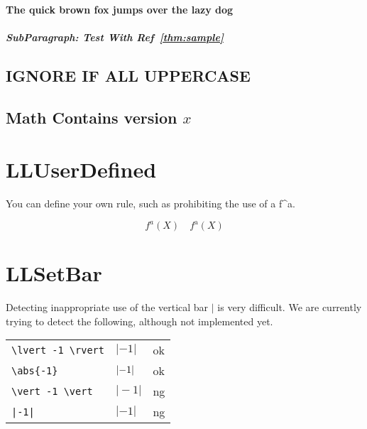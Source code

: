 \documentclass[a4paper]{article}
\newcommand{\tA}[1]{\textcolor{cA}{#1}}
\newcommand{\tD}[1]{\textcolor{cD}{#1}}
\begin{document}
\paragraph{The quick brown fox jumps over the lazy dog}

\subparagraph{SubParagraph: Test With Ref~\ref{thm:sample}}

\subsection{IGNORE IF ALL UPPERCASE}

\subsection{Math Contains version $x$}

\section{LLUserDefined}

You can define your own rule, such as prohibiting the use of a f\^{}a.

\begin{equation*}
	f^a(X) \quad f^{\mathrm{a}}(X)
\end{equation*}

\newpage
\appendix

\renewcommand\thesection{Appendix \Alph{section}}

\section{LLSetBar}

Detecting inappropriate use of the vertical bar $|$ is very difficult.
We are currently trying to detect the following, although not implemented yet.

\begin{table}[H]
	\centering
	\begin{tabular}{lll}
		\verb#\lvert -1 \rvert# & $\lvert -1 \rvert$ & \tA{ok} \\
		\verb#\abs{-1}#         & $\abs{-1}$         & \tA{ok} \\
		\verb#\vert -1 \vert#   & $\vert -1 \vert$   & \tD{ng} \\
		\verb#|-1|#             & $|-1|$             & \tD{ng} \\
	\end{tabular}
\end{table}
\end{document}
